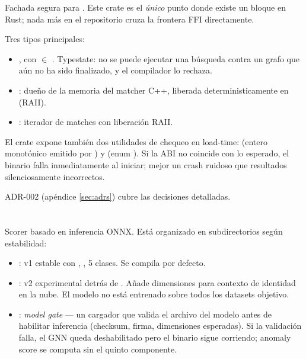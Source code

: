 Fachada segura para . Este crate es el
\emph{único} punto donde existe un bloque  en Rust;
nada más en el repositorio cruza la frontera FFI directamente.

Tres tipos principales:

\begin{itemize}
    \item {}, con  $\in$
    . Typestate: no se puede ejecutar
    una búsqueda contra un grafo que aún no ha sido finalizado, y el
    compilador lo rechaza.
    \item {}: dueño de la memoria del matcher C++,
    liberada deterministicamente en  (RAII).
    \item {}: iterador de matches con liberación RAII.
\end{itemize}

El crate expone también dos utilidades de chequeo en load-time:
 (entero monotónico emitido por
) y  (enum
). Si la ABI no coincide con lo
esperado, el binario falla inmediatamente al iniciar; mejor un
crash ruidoso que resultados silenciosamente incorrectos.

ADR-002 (apéndice \ref{sec:adrs}) cubre las decisiones detalladas.

\section{}

Scorer basado en inferencia ONNX. Está organizado en subdirectorios
según estabilidad:

\begin{itemize}
    \item {}: v1 estable con ,
    , 5 clases. Se compila por defecto.
    \item {}: v2 experimental detrás de
    . Añade dimensiones para
    contexto de identidad en la nube. El modelo no está entrenado
    sobre todos los datasets objetivo.
    \item {}: \emph{model gate} — un
    cargador que valida el archivo del modelo antes de habilitar
    inferencia (checksum, firma, dimensiones esperadas). Si la
    validación falla, el GNN queda deshabilitado pero el binario
    sigue corriendo; anomaly score se computa sin el quinto
    componente.
\end{itemize}

